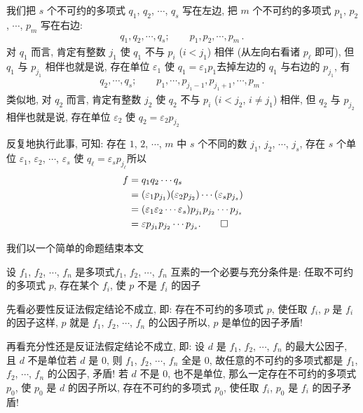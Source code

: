 \begin{pf}
    我们把 $s$ 个不可约的多项式 $q_1$, $q_2$, $\cdots$, $q_s$ 写在左边, 把 $m$ 个不可约的多项式 $p_1$, $p_2$, $\cdots$, $p_m$ 写在右边:
    \begin{align*}
        q_1, q_2, \cdots, q_s; \qquad p_1, p_2, \cdots, p_m \period
    \end{align*}
    对 $q_1$ 而言, 肯定有整数 $j_1$ 使 $q_1$ 不与 $p_i$ ($i < j_1$) 相伴 (从左向右看诸 $p_\ell$ 即可), 但 $q_1$ 与 $p_{j_1}$ 相伴\period 也就是说, 存在单位 $\varepsilon_1$ 使 $q_1 = \varepsilon_1 p_1$\period 去掉左边的 $q_1$ 与右边的 $p_{j_1}$, 有
    \begin{align*}
        q_2, \cdots, q_s; \qquad p_1, \cdots, p_{j_1 - 1}, p_{j_1 + 1}, \cdots, p_m \period
    \end{align*}
    类似地, 对 $q_2$ 而言, 肯定有整数 $j_2$ 使 $q_2$ 不与 $p_i$ ($i < j_2$, $i \neq j_1$) 相伴, 但 $q_2$ 与 $p_{j_2}$ 相伴\period 也就是说, 存在单位 $\varepsilon_2$ 使 $q_2 = \varepsilon_2 p_{j_2}$\period

    反复地执行此事, 可知: 存在 $1$, $2$, $\cdots$, $m$ 中 $s$ 个不同的数 $j_1$, $j_2$, $\cdots$, $j_s$, 存在 $s$ 个单位 $\varepsilon_1$, $\varepsilon_2$, $\cdots$, $\varepsilon_s$ 使 $q_\ell = \varepsilon_s p_{j_\ell}$\period 所以
    \begin{align*}
        f
        = {} & q_1 q_2 \cdots q_s                                                                \\
        = {} & (\varepsilon_1 p_{j_1}) (\varepsilon_2 p_{j_2}) \cdots (\varepsilon_s p_{j_s})    \\
        = {} & (\varepsilon_1 \varepsilon_2 \cdots \varepsilon_s) p_{j_1} p_{j_2} \cdots p_{j_s} \\
        = {} & \varepsilon p_{j_1} p_{j_2} \cdots p_{j_s} . \qedhere
    \end{align*}
\end{pf}

我们以一个简单的命题结束本文\period

\begin{proposition}
    设 $f_1$, $f_2$, $\cdots$, $f_n$ 是多项式\period $f_1$, $f_2$, $\cdots$, $f_n$ 互素的一个必要与充分条件是: 任取不可约的多项式 $p$, 存在某个 $f_i$, 使 $p$ 不是 $f_i$ 的因子\period
\end{proposition}

\begin{pf}
    先看必要性\period 反证法\period 假定结论不成立, 即: 存在不可约的多项式 $p$, 使任取 $f_i$, $p$ 是 $f_i$ 的因子\period 这样, $p$ 就是 $f_1$, $f_2$, $\cdots$, $f_n$ 的公因子\period 所以, $p$ 是单位的因子\period 矛盾!

    再看充分性\period 还是反证法\period 假定结论不成立, 即: 设 $d$ 是 $f_1$, $f_2$, $\cdots$, $f_n$ 的最大公因子, 且 $d$ 不是单位\period 若 $d$ 是 $0$, 则 $f_1$, $f_2$, $\cdots$, $f_n$ 全是 $0$, 故任意的不可约的多项式都是 $f_1$, $f_2$, $\cdots$, $f_n$ 的公因子, 矛盾! 若 $d$ 不是 $0$, 也不是单位, 那么一定存在不可约的多项式 $p_0$, 使 $p_0$ 是 $d$ 的因子\period 所以, 存在不可约的多项式 $p_0$, 使任取 $f_i$, $p_0$ 是 $f_i$ 的因子\period 矛盾!
\end{pf}

